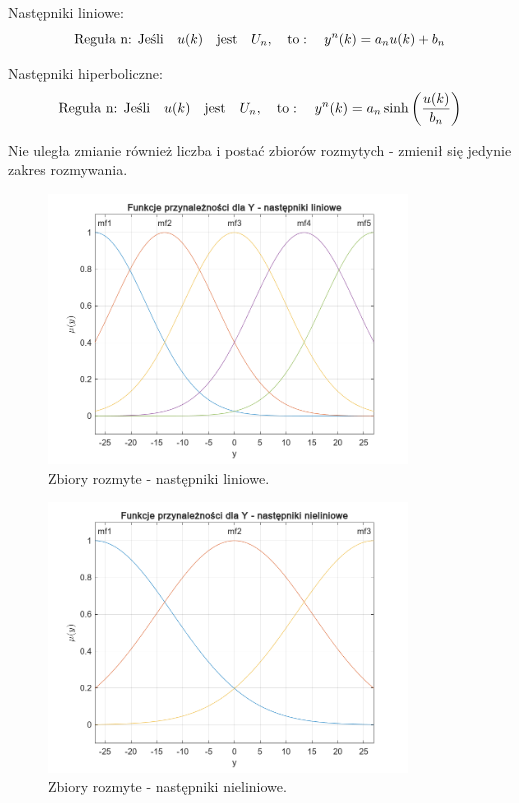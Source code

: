 \begin{description}
\item Następniki liniowe:
\begin{equation}
\text{Reguła n: Jeśli} \quad u(k) \quad \text{jest} \quad U_n, \quad \text{to}: \quad y^n(k) = a_n u(k) + b_n \\[10pt]
\end{equation}

\item Następniki hiperboliczne:
\begin{equation}
\text{Reguła n: Jeśli} \quad u(k) \quad \text{jest} \quad U_n, \quad \text{to}: \quad y^n(k) = a_n \sinh\left(\frac{u(k)}{b_n}\right) \\[10pt]
\end{equation}
\end{description}

\newpage

Nie uległa zmianie również liczba i postać zbiorów rozmytych - zmienił się jedynie zakres rozmywania. 

\begin{figure}[h!]
\centering
\includegraphics[width=0.85\textwidth]{pictures/WienerfuzzySets_liniowe}
\caption{Zbiory rozmyte - następniki liniowe.}
\end{figure}

\vfill

\begin{figure}[h!]
\centering
\includegraphics[width=0.85\textwidth]{pictures/WienerfuzzySets_nieliniowe}
\caption{Zbiory rozmyte - następniki nieliniowe.}
\end{figure}

